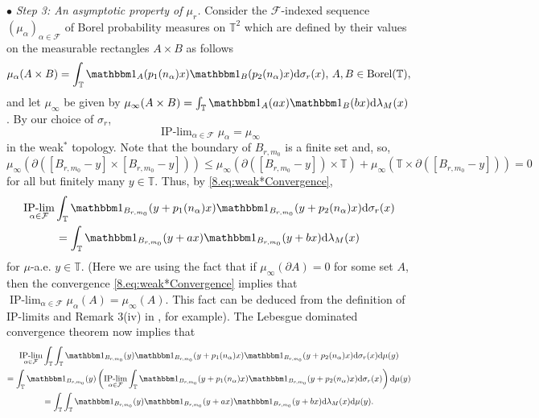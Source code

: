 \documentclass[11pt,american,preprint]{elsarticle}
\numberwithin{equation}{section}
\theoremstyle{plain}
\theoremstyle{plain*}
\theoremstyle{plain}
\theoremstyle{plain*}
\theoremstyle{plain}
\theoremstyle{plain*}
\theoremstyle{remark}
\theoremstyle{remark*}
\theoremstyle{remark}
\theoremstyle{remark*}
\theoremstyle{remark}
\theoremstyle{remark*}
\theoremstyle{plain}
\theoremstyle{definition}
\theoremstyle{plain}
\theoremstyle{plain} %
\begin{document}
$\bullet$ \textit{ Step 3: An asymptotic property of $\mu_r$.} Consider the $\mathcal F$-indexed sequence   $(\mu_\alpha)_{\alpha\in\mathcal F}$ of Borel probability measures on $\mathbb T^2$ which are defined by their values on the measurable rectangles $A\times B$ as follows 
$$
\mu_{\alpha}(A\times B)=\int_\mathbb T\mathbbm 1_A(p_1(n_\alpha) x)\mathbbm 1_{B}(p_2(n_\alpha)x)\text{d}\sigma_r(x),\,A,B\in \text{Borel}(\mathbb T),
$$
and let $\mu_\infty$ be given by 
$
\mu_{\infty}(A\times B)=\int_\mathbb T\mathbbm 1_A(a x)\mathbbm 1_{B}(b x)\text{d}\lambda_M(x)
$. By our choice of $\sigma_r$, 
\begin{equation}\label{8.eq:weak*Convergence}
\mathop{\text{IP-lim}}_{\alpha\in\mathcal F}\mu_\alpha=\mu_\infty
\end{equation}
in the weak$^*$ topology. Note that the boundary of $B_{r,m_0}$ is a finite set and, so, $$\mu_\infty(\partial([B_{r,m_0}-y]\times [B_{r,m_0}-y]))\leq\mu_\infty(\partial([B_{r,m_0}-y])\times\mathbb T)+\mu_\infty(\mathbb T\times\partial([B_{r,m_0}-y])) =0$$
for all but finitely many $y\in\mathbb T$. Thus, by \eqref{8.eq:weak*Convergence}, 
\begin{multline*}
\mathop{\text{IP-lim}}_{\alpha\in\mathcal F}\int_{\mathbb T}\mathbbm 1_{B_{r,m_0}}(y+p_1(n_\alpha)x)\mathbbm 1_{B_{r,m_0}}(y+p_2(n_\alpha)x)\text{d}\sigma_r(x)\\
=\int_{\mathbb T}\mathbbm 1_{B_{r,m_0}}(y+ax)\mathbbm 1_{B_{r,m_0}}(y+bx)\text{d}\lambda_M(x)
\end{multline*}
for $\mu$-a.e. $y\in \mathbb T$. (Here we are using the fact that if $\mu_\infty(\partial A)=0$ for some set $A$, then the convergence \eqref{8.eq:weak*Convergence} implies that $\mathop{\text{IP-lim}}_{\alpha\in\mathcal F}\mu_\alpha(A)=\mu_\infty(A)$. This fact can be deduced from the definition of IP-limits and Remark 3(iv) in \cite[p. 149]{waltersIntroduction}, for example). 
The Lebesgue dominated convergence theorem now implies that 
\begin{multline*}
\mathop{\text{IP-lim}}_{\alpha\in\mathcal F}\int_{\mathbb T}\int_{\mathbb T}\mathbbm 1_{B_{r,m_0}}(y)\mathbbm 1_{B_{r,m_0}}(y+p_1(n_\alpha)x)\mathbbm 1_{B_{r,m_0}}(y+p_2(n_\alpha)x)\text{d}\sigma_r(x)\text{d}\mu(y)\\
=\int_{\mathbb T}\mathbbm 1_{B_{r,m_0}}(y)\left(\mathop{\text{IP-lim}}_{\alpha\in\mathcal F}\int_{\mathbb T}\mathbbm 1_{B_{r,m_0}}(y+p_1(n_\alpha)x)\mathbbm 1_{B_{r,m_0}}(y+p_2(n_\alpha)x)\text{d}\sigma_r(x)\right)\text{d}\mu(y)\\
=\int_{\mathbb T}\int_{\mathbb T}\mathbbm 1_{B_{r,m_0}}(y)\mathbbm 1_{B_{r,m_0}}(y+ax)\mathbbm 1_{B_{r,m_0}}(y+bx)\text{d}\lambda_M(x)\text{d}\mu(y).
\end{multline*}
\end{document}
